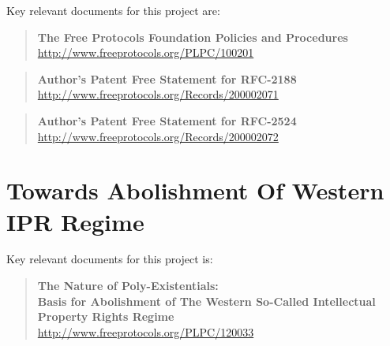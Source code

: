 Key relevant documents for this project are:

\begin{quote}
  \textbf{The Free Protocols Foundation Policies and Procedures}\\
  \href{http://www.freeprotocols.org/PLPC/100201}{http://www.freeprotocols.org/PLPC/100201}
\end{quote}
\begin{quote}
  \textbf{Author's Patent Free Statement for RFC-2188}\\
  \href{http://www.freeprotocols.org/Records/200002071}{http://www.freeprotocols.org/Records/200002071}
\end{quote}
\begin{quote}
  \textbf{Author's Patent Free Statement for RFC-2524}\\
  \href{http://www.freeprotocols.org/Records/200002072}{http://www.freeprotocols.org/Records/200002072}
\end{quote}

\section{Towards Abolishment Of Western IPR Regime}

Key relevant documents for this project is:

\begin{quote}
  \textbf{The Nature of Poly-Existentials:}\\
  \textbf{Basis for Abolishment of  The Western So-Called Intellectual Property Rights Regime}\\
  \href{http://www.freeprotocols.org/PLPC/120033}{http://www.freeprotocols.org/PLPC/120033}
\end{quote}

